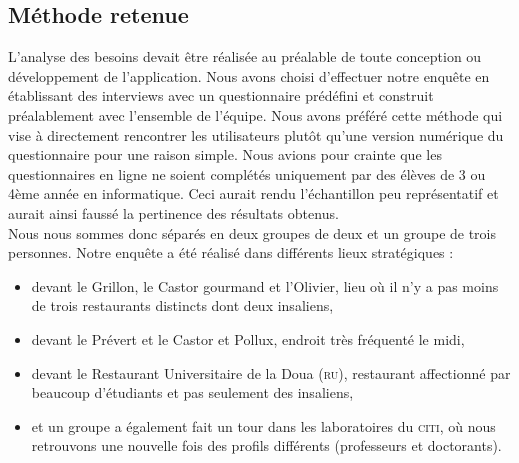 \subsection{Méthode retenue}

L'analyse des besoins devait être réalisée au préalable de toute conception ou
développement de l'application. Nous avons choisi d'effectuer notre enquête en
établissant des interviews avec un questionnaire prédéfini et construit préalablement 
avec l'ensemble de l'équipe. Nous avons préféré cette méthode qui 
vise à directement rencontrer les utilisateurs plutôt qu'une version numérique
du questionnaire pour une raison simple. Nous avions pour crainte que les 
questionnaires en ligne ne soient complétés uniquement 
par des élèves de 3 ou 4ème année en informatique. Ceci aurait rendu l'échantillon
peu représentatif et aurait ainsi faussé la pertinence des résultats obtenus. \\
Nous nous sommes donc séparés en deux groupes de deux et un groupe de trois personnes.
Notre enquête a été réalisé dans différents lieux stratégiques : 
\begin{itemize}
\item devant le Grillon, le Castor gourmand et l'Olivier, lieu où il n'y a pas
moins de trois restaurants distincts dont deux insaliens,
\item devant le Prévert et le Castor et Pollux, endroit très fréquenté le midi,
\item devant le Restaurant Universitaire de la Doua (\textsc{ru}), restaurant affectionné
par beaucoup d'étudiants et pas seulement des insaliens,
\item et un groupe a également fait un tour dans les laboratoires du \textsc{citi}, où
nous retrouvons une nouvelle fois des profils différents (professeurs et 
doctorants).
\end{itemize}

